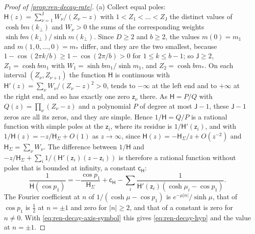 \begin{proof}[Proof of \cref{prop:ren-decay-rate}]
(a) Collect equal poles: $\mathsf H(z)=\sum_{\nu=1}^{\mathsf J}W_\nu/(Z_\nu-z)$ with $1<Z_1<\dots<Z_{\mathsf J}$ the distinct values of $\cosh bm(k_\perp)$ and $W_\nu>0$ the sums of the corresponding weights $\sinh bm(k_\perp)/\sinh m(k_\perp)$. Since $D\ge2$ and $b\ge2$, the values $m(0)=m_1$ and $m(1,0,\dots,0)=m_\ast$ differ, and they are the two smallest, because $1-\cos(2\pi k/b)\ge1-\cos(2\pi/b)>0$ for $1\le k\le b-1$; so $\mathsf J\ge2$, $Z_1=\cosh bm_1$ with $W_1=\sinh bm_1/\sinh m_1$, and $Z_2=\cosh bm_\ast$. On each interval $(Z_\nu,Z_{\nu+1})$ the function $\mathsf H$ is continuous with $\mathsf H'(z)=\sum_\nu W_\nu/(Z_\nu-z)^2>0$, tends to $-\infty$ at the left end and to $+\infty$ at the right end, and so has exactly one zero $\mathsf z_\nu$ there. As $\mathsf H=P/Q$ with $Q(z)=\prod_\nu(Z_\nu-z)$ and a polynomial $P$ of degree at most $\mathsf J-1$, these $\mathsf J-1$ zeros are all its zeros, and they are simple. Hence $1/\mathsf H=Q/P$ is a rational function with simple poles at the $\mathsf z_i$, where its residue is $1/\mathsf H'(\mathsf z_i)$, and with $1/\mathsf H(z)=-z/\mathsf H_\Sigma+O(1)$ as $z\to\infty$, since $\mathsf H(z)=-\mathsf H_\Sigma/z+O(z^{-2})$ and $\mathsf H_\Sigma=\sum_\nu W_\nu$. The difference between $1/\mathsf H$ and $-z/\mathsf H_\Sigma+\sum_i1/(\mathsf H'(\mathsf z_i)(z-\mathsf z_i))$ is therefore a rational function without poles that is bounded at infinity, a constant $\mathsf c_{\mathsf H}$:
\[
\frac1{\mathsf H(\cos p_1)}=-\frac{\cos p_1}{\mathsf H_\Sigma}+\mathsf c_{\mathsf H}-\sum_i\frac1{\mathsf H'(\mathsf z_i)(\cosh\mu_i-\cos p_1)}.
\]
The Fourier coefficient at $n$ of $1/(\cosh\mu-\cos p_1)$ is $e^{-\mu\lvert n\rvert}/\sinh\mu$, that of $\cos p_1$ is $\frac12$ at $n=\pm1$ and zero for $\lvert n\rvert\ge2$, and that of a constant is zero for $n\ne0$. With \eqref{eq:ren-decay-axis-symbol} this gives \eqref{eq:ren-decay-hyp} and the value at $n=\pm1$.


\end{proof}
